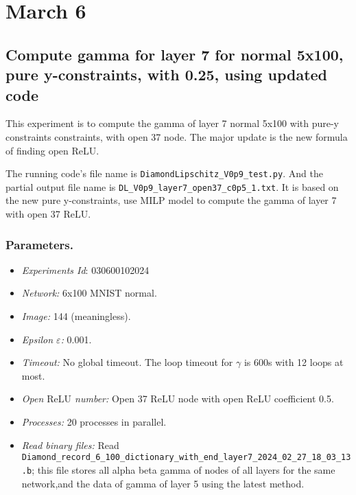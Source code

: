 \documentclass{llncs}
\newcommand{\ReLU}{\mathrm{ReLU}}
\begin{document}
\section{March 6}

\subsection{Compute gamma for layer 7 for normal 5x100, pure y-constraints, with 0.25, using updated code}

This experiment is to compute the gamma of layer 7 normal 5x100 with pure-y constraints constraints, with open 37 node. The major update is the new formula of finding open ReLU.

\vspace*{1ex}

The running code's file name is \verb*|DiamondLipschitz_V0p9_test.py|. And the partial output file name is \verb*|DL_V0p9_layer7_open37_c0p5_1.txt|.  It is based on the new pure y-constraints, use MILP model to compute the gamma of layer 7 with open 37 ReLU.

\subsubsection*{Parameters.}

\begin{itemize}
	\item\emph{Experiments Id}: 030600102024
	
	\item\emph{Network:} 6x100 MNIST normal. 
	
	\item\emph{Image:} 144 (meaningless).
	
	\item\emph{Epsilon $\varepsilon$:} 0.001.
	
	\item\emph{Timeout:} No global timeout. The loop timeout for $\gamma$ is 600s with 12 loops at most.
	
	\item\emph{Open $\ReLU$ number:} Open 37 ReLU node with open ReLU coefficient 0.5.
	
	\item\emph{Processes:} 20 processes in parallel. 
	
	\item\emph{Read binary files:} Read \verb*|Diamond_record_6_100_dictionary_with_end_layer7_2024_02_27_18_03_13.b|; this file stores all alpha beta gamma of nodes of all layers for the same network,and the data of gamma of layer 5 using the latest method. 
\end{itemize}
\end{document}
